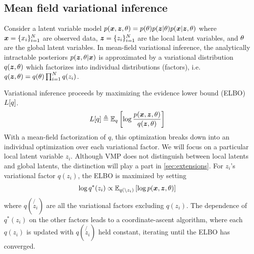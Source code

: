 \subsection{Mean field variational inference}

Consider a latent variable model $p(\bm{x}, \bm{z}, \theta) = p(\theta)p(\bm{z} | \theta)p(\bm{x} | \bm{z}, \theta)$
where $\bm{x}=\{x_i\}_{i = 1}^N$ are observed data, $\bm{z} =\{z_i\}_{i = 1}^N$ are
the local latent variables, and $\theta$ are the global latent variables.
In mean-field variational inference, 
the analytically intractable
posteriors $p(\bm{z}, \theta|\bm{x})$ is approximated
by a variational distribution $q(\bm{z}, \theta)$
which factorizes into individual distributions (factors), i.e.
$q(\bm{z}, \theta) = q(\theta)\prod_{i = 1}^N q(z_i)$.

Variational inference proceeds by
maximizing the evidence lower bound (ELBO) $L[q]$.
\begin{equation}
    L[q] \triangleq \mathbb{E}_q\left[\log \frac{p(\bm{x}, \bm{z}, \theta)}{q(\bm{z}, \theta)}\right]
\end{equation}
With a mean-field factorization of $q$, this optimization
breaks down into an individual optimization
over each variational factor. 
We will focus on a particular local latent variable $z_i$.
Although VMP does not distinguish between local latents
and global latents, the distinction will play a part in \autoref{sec:extensions}.
For $z_i$'s variational factor $q(z_i)$,
the ELBO is maximized by setting
\begin{equation}
    \log q^*(z_i) \propto \mathbb{E}_{q(\backslash z_i)} \left[
    \log p(\bm{x}, \bm{z}, \theta)\right]
\end{equation}
where $q(\not{z_i})$ are all the variational factors excluding $q(z_i)$.
The dependence of $q^*(z_i)$ on the other factors leads
to a coordinate-ascent algorithm, where 
each $q(z_i)$ is updated with $q(\not{z_i})$ held constant,
iterating until
the ELBO has converged.

